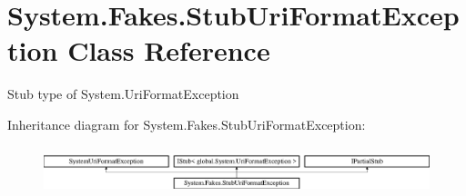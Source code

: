 \hypertarget{class_system_1_1_fakes_1_1_stub_uri_format_exception}{\section{System.\-Fakes.\-Stub\-Uri\-Format\-Exception Class Reference}
\label{class_system_1_1_fakes_1_1_stub_uri_format_exception}
}


Stub type of System.\-Uri\-Format\-Exception 


Inheritance diagram for System.\-Fakes.\-Stub\-Uri\-Format\-Exception\-:\begin{figure}[H]
\begin{center}
\leavevmode
\includegraphics[height=1.414141cm]{class_system_1_1_fakes_1_1_stub_uri_format_exception}
\end{center}
\end{figure}
